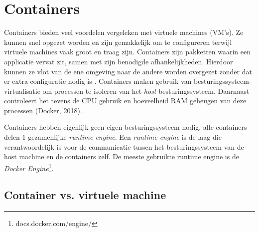 \section{Containers} \label{containers}

Containers bieden veel voordelen vergeleken met virtuele machines (VM's). Ze kunnen snel opgezet worden en zijn gemakkelijk om te configureren terwijl virtuele machines vaak groot en traag zijn. Containers zijn pakketten waarin een applicatie vervat zit, samen met zijn benodigde afhankelijkheden. Hierdoor kunnen ze vlot van de ene omgeving naar de andere worden overgezet zonder dat er extra configuratie nodig is \autocite{Education2019}. Containers maken gebruik van besturingssysteem-virtualisatie om processen te isoleren van het \textit{host} besturingssysteem. Daarnaast controleert het tevens de CPU gebruik en hoeveelheid RAM geheugen van deze processen (Docker, 2018).

Containers hebben eigenlijk geen eigen besturingssysteem nodig, alle containers delen 1 gezamenlijke \textit{runtime engine}. Een \textit{runtime engine} is de laag die verantwoordelijk is voor de communicatie tussen het besturingssysteem van de host machine en de containers zelf. De meeste gebruikte runtime engine is de \textit{Docker Engine}\footnote{docs.docker.com/engine/}.

\subsection{Container vs. virtuele machine}
